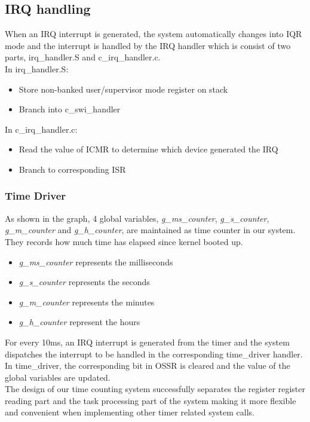 \documentclass{article}
\begin{document}
\subsection{IRQ handling}
When an IRQ interrupt is generated, the system automatically changes into IQR mode and the interrupt is handled by the IRQ handler which is consist of two parts, irq\_handler.S and c\_irq\_handler.c.\\
In irq\_handler.S:
	 \begin{itemize}
	  \setlength{\itemsep}{1pt}
	  \setlength{\parskip}{0pt}
	  \setlength{\parsep}{0pt}
	\item Store non-banked user/supervisor mode register on stack
	\item Branch into c\_swi\_handler
	\end{itemize}
In c\_irq\_handler.c:
	\begin{itemize}
	  \setlength{\itemsep}{1pt}
	  \setlength{\parskip}{0pt}
	  \setlength{\parsep}{0pt}
	\item Read the value of ICMR to determine which device generated the IRQ 
	\item Branch to corresponding ISR
\end{itemize}

\subsubsection{Time Driver}	
As shown in the graph, 4 global variables, {\it g\_ms\_counter}, {\it g\_s\_counter}, {\it g\_m\_counter} and {\it g\_h\_counter}, are maintained as time counter in our system. They records how much time has elapsed since kernel booted up. 
 \begin{itemize}
	  \setlength{\itemsep}{1pt}
	  \setlength{\parskip}{0pt}
	  \setlength{\parsep}{0pt}
	  \item {\it g\_ms\_counter} represents the milliseconds
	  \item {\it g\_s\_counter} represents the seconds
	  \item {\it g\_m\_counter} represents the minutes
	  \item {\it g\_h\_counter} represent the hours
\end{itemize}

For every 10ms, an IRQ interrupt is generated from the timer and the system dispatches the interrupt to be handled in the corresponding time\_driver handler. In time\_driver, the corresponding bit in OSSR is cleared and the value of the global variables are updated.\\
\newline
The design of our time counting system successfully separates the register register reading part and the task processing part of the system making it more flexible and convenient when implementing other timer related system calls.
\newline
\end{document}
